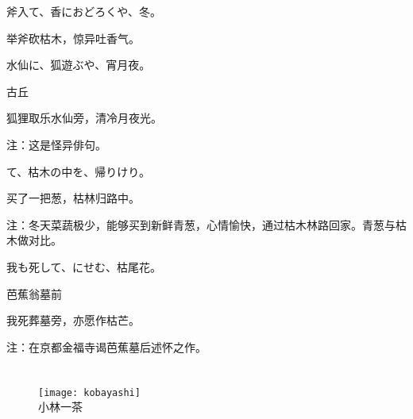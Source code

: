 \begin{haiku}
    {\FH 斧入て、香におどろくや、冬。}

    {\FK 举斧砍枯木，惊异吐香气。}
\end{haiku}

\begin{haiku}
    {\FH 水仙に、狐遊ぶや、宵月夜。}

    {\FK 古丘}

    {\FK 狐狸取乐水仙旁，清冷月夜光。}

    {\FT 注：这是怪异俳句。}
\end{haiku}

\begin{haiku}
    {\FH {}て、枯木の中を、帰りけり。}

    {\FK 买了一把葱，枯林归路中。}

    {\FT 注：冬天菜蔬极少，能够买到新鲜青葱，心情愉快，通过枯木林路回家。青葱与枯木做对比。}
\end{haiku}

\begin{haiku}
    {\FH 我も死して、にせむ、枯尾花。}

    {\FK 芭蕉翁墓前}

    {\FK 我死葬墓旁，亦愿作枯芒。}

    {\FT 注：在京都金福寺谒芭蕉墓后述怀之作。}
\end{haiku}

\chapter[{\FM 小林一茶}]{\FM {}}

\begin{center}
    \begin{figure}
        \centering
        \texttt{[image: kobayashi]}\\[1em]
        \large{\FS 小林一茶}
    \end{figure}
\end{center}

\newpage

